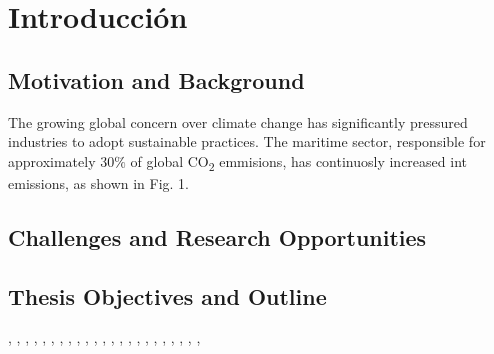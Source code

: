 \chapter{Introducción}


\section{Motivation and Background}

The growing global concern over climate change has significantly pressured industries to adopt sustainable practices. The maritime sector, responsible for approximately 30$\%$ of global CO\textsubscript{2} emmisions, has continuosly increased int emissions, as shown in Fig. 1.



\section{Challenges and Research Opportunities}


\section{Thesis Objectives and Outline}




\cite{10735355},
\cite{10679076},
\cite{10472698},
\cite{10382632},
\cite{10269751},
\cite{10091779},
\cite{10136711},
\cite{10015728},
\cite{9937167},
\cite{9738734},
\cite{9913469},
\cite{9360490},
\cite{9340547},
\cite{9242285},
\cite{9184122},
\cite{9299429},
\cite{9046048},
\cite{8322257},
\cite{7945527},
\cite{8013775},
\cite{7956250},
\cite{7836306},
\cite{7604136},



